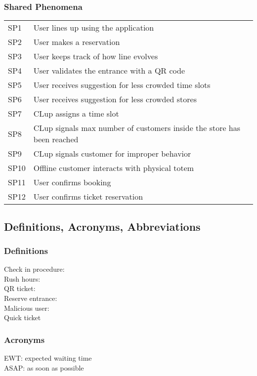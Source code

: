 \subsubsection{Shared Phenomena}
\begin{tabular}{l|l}
	SP1 & User lines up using the application \\
	SP2 & User makes a reservation \\
	SP3 & User keeps track of how line evolves \\
	SP4 & User validates the entrance with a QR code \\
	SP5 & User receives suggestion for less crowded time slots \\
	SP6 & User receives suggestion for less crowded stores \\
	SP7 & CLup assigns a time slot \\
	SP8 & CLup signals max number of customers inside the store has been reached \\
	SP9 & CLup signals customer for improper behavior \\
	SP10 & Offline customer interacts with physical totem \\
	SP11 & User confirms booking \\
	SP12 & User confirms ticket reservation \\
	
\end{tabular}

\subsection{Definitions, Acronyms, Abbreviations}

\subsubsection{Definitions}
Check in procedure:\\
Rush hours:\\
QR ticket:\\
Reserve entrance:\\
Malicious user:\\
Quick ticket

\subsubsection{Acronyms}
EWT: expected waiting time\\
ASAP: as soon as possible\\

